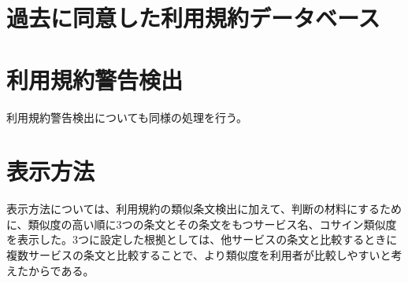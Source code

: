 \section{過去に同意した利用規約データベース}


\section{利用規約警告検出}
利用規約警告検出についても同様の処理を行う。

\section{表示方法}
表示方法については、利用規約の類似条文検出に加えて、判断の材料にするために、類似度の高い順に3つの条文とその条文をもつサービス名、コサイン類似度を表示した。3つに設定した根拠としては、他サービスの条文と比較するときに複数サービスの条文と比較することで、より類似度を利用者が比較しやすいと考えたからである。

